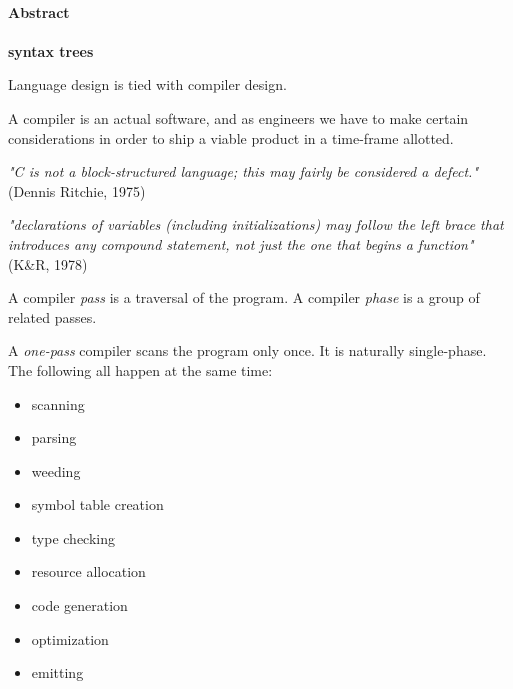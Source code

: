 


\begin{slide*}
\begin{tabbing}
~\\
{\Huge\bf Abstract}\\ ~\\ {\Huge\bf syntax trees}\\
\end{tabbing}

\begin{center}
\end{center}

\vfil
\end{slide*}

\begin{slide*}
    Language design is tied with compiler design.


    A compiler is an actual software,
    and as engineers we have to make certain considerations 
    in order to ship a viable product in a time-frame allotted.


    \emph{"C is not a block-structured language; 
    this may fairly be considered a defect."} 
    \\ (Dennis Ritchie, 1975)


    \emph{"declarations of variables (including initializations) may follow 
    the left brace that introduces any compound statement, 
    not just the one that begins a function"} 
    \\(K\&R, 1978)

\vfil
\end{slide*}

\begin{slide*}
A compiler {\em pass} is a traversal of the program.
A compiler {\em phase} is a group of related passes.

A {\em one-pass} compiler scans the program only once.  It is
naturally single-phase.  The following all happen at the same time:

\begin{itemize}
\item scanning
\item parsing
\item weeding
\item symbol table creation
\item type checking
\item resource allocation
\item code generation
\item optimization
\item emitting
\end{itemize}
\vfil
\end{slide*}

